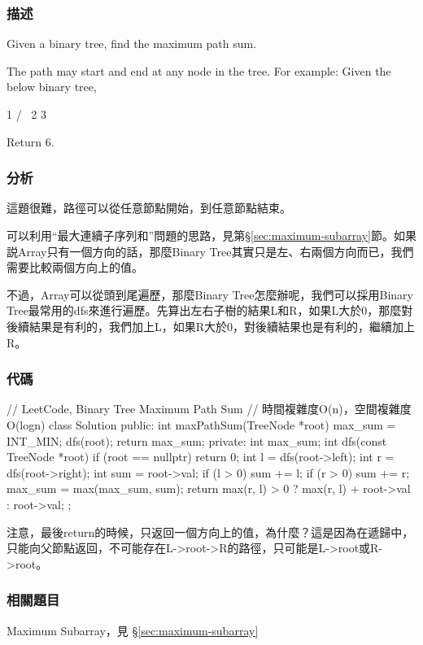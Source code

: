 \subsubsection{描述}
Given a binary tree, find the maximum path sum.

The path may start and end at any node in the tree.
For example:
Given the below binary tree,
\begin{Code}
  1
 / \
2   3
\end{Code}
Return $6$.


\subsubsection{分析}
這題很難，路徑可以從任意節點開始，到任意節點結束。

可以利用“最大連續子序列和”問題的思路，見第\S \ref{sec:maximum-subarray}節。如果説Array只有一個方向的話，那麼Binary Tree其實只是左、右兩個方向而已，我們需要比較兩個方向上的值。

不過，Array可以從頭到尾遍歷，那麼Binary Tree怎麼辦呢，我們可以採用Binary Tree最常用的dfs來進行遍歷。先算出左右子樹的結果L和R，如果L大於0，那麼對後續結果是有利的，我們加上L，如果R大於0，對後續結果也是有利的，繼續加上R。

\subsubsection{代碼}

\begin{Code}
// LeetCode, Binary Tree Maximum Path Sum
// 時間複雜度O(n)，空間複雜度O(logn)
class Solution {
public:
    int maxPathSum(TreeNode *root) {
        max_sum = INT_MIN;
        dfs(root);
        return max_sum;
    }
private:
    int max_sum;
    int dfs(const TreeNode *root) {
        if (root == nullptr) return 0;
        int l = dfs(root->left);
        int r = dfs(root->right);
        int sum = root->val;
        if (l > 0) sum += l;
        if (r > 0) sum += r;
        max_sum = max(max_sum, sum);
        return max(r, l) > 0 ? max(r, l) + root->val : root->val;
    }
};
\end{Code}

注意，最後return的時候，只返回一個方向上的值，為什麼？這是因為在遞歸中，只能向父節點返回，不可能存在L->root->R的路徑，只可能是L->root或R->root。


\subsubsection{相關題目}
\begindot
\item Maximum Subarray，見 \S \ref{sec:maximum-subarray}
\myenddot


